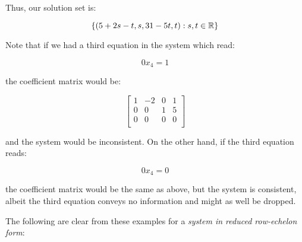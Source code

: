 \documentclass[10pt]{amsart}
\begin{document}
Thus, our solution set is:

$$\{ (5 + 2s - t, s, 31 - 5t, t ) : s,t \in \mathbb{R} \}$$

Note that if we had a third equation in the system which read:

$$0x_4 = 1$$

the coefficient matrix would be:

$$\left[\begin{matrix}
1 & -2 & 0 & 1 \\
0 & 0 & 1 & 5 \\
0 & 0 & 0 & 0 \\
\end{matrix}\right]$$

and the system would be inconsistent. On the other hand, if the third equation reads:

$$0x_4 = 0$$

the coefficient matrix would be the same as above, but the system is
consistent, albeit the third equation conveys no information and might
as well be dropped.

The following are clear from these examples for a {\em system in
  reduced row-echelon form}:
\end{document}
